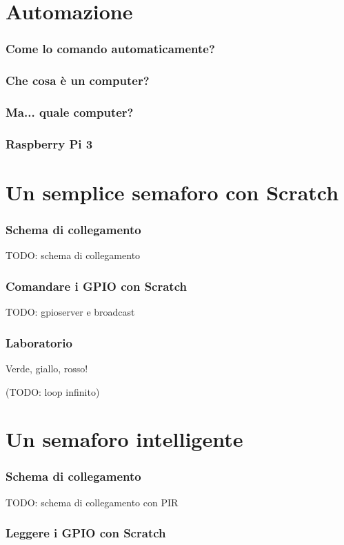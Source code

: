 \documentclass[xetex,table]{beamer}
\begin{document}
\section{Automazione}

\begin{frame}
  \frametitle{Come lo comando automaticamente?}
\end{frame}

\begin{frame}
  \frametitle{Che cosa è un computer?}
\end{frame}

\begin{frame}
  \frametitle{Ma... quale computer?}
\end{frame}

\begin{frame}
  \frametitle{Raspberry Pi 3}
\end{frame}

\section{Un semplice semaforo con Scratch}

\begin{frame}
  \frametitle{Schema di collegamento}
  TODO: schema di collegamento
\end{frame}

\begin{frame}
  \frametitle{Comandare i GPIO con Scratch}
  TODO: gpioserver e broadcast
\end{frame}

\begin{frame}
\frametitle[Lab! Verde, giallo, rosso!]{Laboratorio}
  \begin{center}
    \LARGE
    Verde, giallo, rosso!

    (TODO: loop infinito)
  \end{center}
\end{frame}

\section{Un semaforo intelligente}

\begin{frame}
  \frametitle{Schema di collegamento}
  TODO: schema di collegamento con PIR
\end{frame}

\begin{frame}
  \frametitle{Leggere i GPIO con Scratch}
\end{frame}
\end{document}
